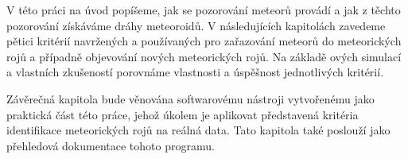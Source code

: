 \medskip

V této práci na úvod popíšeme, jak se pozorování meteorů provádí a jak z těchto pozorování získáváme dráhy meteoroidů. V následujících kapitolách zavedeme pětici kritérií navržených a používaných pro zařazování meteorů do meteorických rojů a případně objevování nových meteorických rojů. Na základě \citeauthor{galligan}ových simulací a vlastních zkušeností porovnáme vlastnosti a úspěšnost jednotlivých kritérií.

Závěrečná kapitola bude věnována softwarovému nástroji vytvořenému jako praktická část této práce, jehož úkolem je aplikovat představená kritéria identifikace meteorických rojů na reálná data. Tato kapitola také poslouží jako přehledová dokumentace tohoto programu.